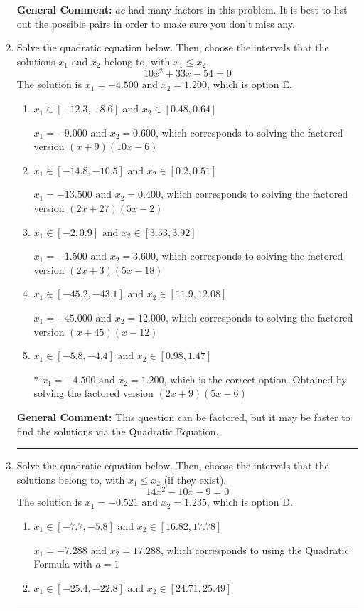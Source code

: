 \documentclass{extbook}[14pt]
\newcommand{\litem}[1]{\item #1

\rule{\textwidth}{0.4pt}}
\begin{document}
\begin{enumerate}
{\textbf{General Comment:} $ac$ had many factors in this problem. It is best to list out the possible pairs in order to make sure you don't miss any.
}
\litem{
Solve the quadratic equation below. Then, choose the intervals that the solutions $x_1$ and $x_2$ belong to, with $x_1 \leq x_2$.
\[ 10x^{2} +33 x -54 = 0 \]The solution is \( x_1 = -4.500 \text{ and } x_2 = 1.200 \), which is option E.\begin{enumerate}[label=\Alph*.]
\item \( x_1 \in [-12.3, -8.6] \text{ and } x_2 \in [0.48, 0.64] \)

$x_1 = -9.000 \text{ and } x_2 = 0.600$, which corresponds to solving the factored version $(x + 9)(10x -6)$
\item \( x_1 \in [-14.8, -10.5] \text{ and } x_2 \in [0.2, 0.51] \)

$x_1 = -13.500 \text{ and } x_2 = 0.400$, which corresponds to solving the factored version $(2x + 27)(5x -2)$
\item \( x_1 \in [-2, 0.9] \text{ and } x_2 \in [3.53, 3.92] \)

$x_1 = -1.500 \text{ and } x_2 = 3.600$, which corresponds to solving the factored version $(2x + 3)(5x -18)$
\item \( x_1 \in [-45.2, -43.1] \text{ and } x_2 \in [11.9, 12.08] \)

$x_1 = -45.000 \text{ and } x_2 = 12.000$, which corresponds to solving the factored version $(x + 45)(x -12)$
\item \( x_1 \in [-5.8, -4.4] \text{ and } x_2 \in [0.98, 1.47] \)

* $x_1 = -4.500 \text{ and } x_2 = 1.200$, which is the correct option. Obtained by solving the factored version $(2x + 9)(5x -6)$
\end{enumerate}

\textbf{General Comment:} This question can be factored, but it may be faster to find the solutions via the Quadratic Equation.
}
\litem{
Solve the quadratic equation below. Then, choose the intervals that the solutions belong to, with $x_1 \leq x_2$ (if they exist).
\[ 14x^{2} -10 x -9 = 0 \]The solution is \( x_1 = -0.521 \text{ and } x_2 = 1.235 \), which is option D.\begin{enumerate}[label=\Alph*.]
\item \( x_1 \in [-7.7, -5.8] \text{ and } x_2 \in [16.82, 17.78] \)

 $x_1 = -7.288 \text{ and } x_2 = 17.288$, which corresponds to using the Quadratic Formula with $a=1$
\item \( x_1 \in [-25.4, -22.8] \text{ and } x_2 \in [24.71, 25.49] \)


\end{enumerate}}
\end{enumerate}
\end{document}
